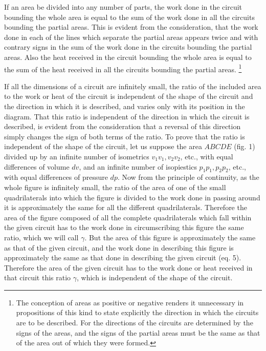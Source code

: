 \documentclass[11pt]{article}
\begin{document}
If an area be divided into any number of parts, the work done in the circuit bounding the whole area is equal to the sum of the work done in all the circuits bounding the partial areas. This is evident from the consideration, that the work done in each of the lines which separate the partial areas appears twice and with contrary signs in the sum of the work done in the circuits bounding the partial areas. Also the heat received in the circuit bounding the whole area is equal to the sum of the heat received in all the circuits bounding the partial areas.
\footnote{The conception of areas as positive or negative renders it unnecessary in propositions of this kind to state explicitly the direction in which the circuits are to be described. For the directions of the circuits are determined by the signs of the areas, and the signs of the partial areas must be the same as that of the area out of which they were formed.}

If all the dimensions of a circuit are infinitely small, the ratio of the included area to the work or heat of the circuit is independent of the shape of the circuit and the direction in which it is described, and varies only with its position in the diagram. That this ratio is independent of the direction in which the circuit is described, is evident from the consideration that a reversal of this direction simply changes the sign of both terms of the ratio. To prove that the ratio is independent of the shape of the circuit, let us suppose the area $ABCDE$ (fig. 1) divided up by an infinite number of isometrics $v_1v_1, v_2v_2$, etc., with equal differences of volume $dv$, and an infinite number of isopiestics $p_1p_1, p_2p_2$, etc., with equal differences of pressure $dp$. Now from the principle of continuity, as the whole figure is infinitely small, the ratio of the area of one of the small quadrilaterals into which the figure is divided to the work done in passing around it is approximately the same for all the different quadrilaterals. Therefore the area of the figure composed of all the complete quadrilaterals which fall within the given circuit has to the work done in circumscribing this figure the same ratio, which we will call $\gamma$. But the area of this figure is approximately the same as that of the given circuit, and the work done in describing this figure is approximately the same as that done in describing the given circuit (eq. 5). Therefore the area of the given circuit has to the work done or heat received in that circuit this ratio $\gamma$, which is independent of the shape of the circuit.
\end{document}
